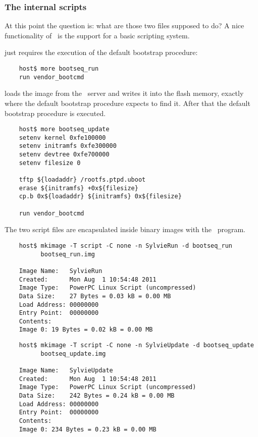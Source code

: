     \subsubsection{The internal scripts}

        At this point the question is: what are those two files supposed to
        do? A nice functionality of \uBoot\ is the support for a basic
        scripting system.

         just requires the execution of the default
        bootstrap procedure:
\begin{lstlisting}
    host$ more bootseq_run
    run vendor_bootcmd
\end{lstlisting}

         loads the 
        image from the \TFTP\ server and writes it into the flash memory,
        exactly where the default bootstrap procedure expects to find it.
        After that the default bootstrap procedure is executed.
\begin{lstlisting}
    host$ more bootseq_update
    setenv kernel 0xfe100000
    setenv initramfs 0xfe300000
    setenv devtree 0xfe700000
    setenv filesize 0

    tftp ${loadaddr} /rootfs.ptpd.uboot
    erase ${initramfs} +0x${filesize}
    cp.b 0x${loadaddr} ${initramfs} 0x${filesize}

    run vendor_bootcmd
\end{lstlisting}

        The two script files are encapsulated inside binary images with
        the \mkimage\ program.
\begin{lstlisting}
    host$ mkimage -T script -C none -n SylvieRun -d bootseq_run
          bootseq_run.img

    Image Name:   SylvieRun
    Created:      Mon Aug  1 10:54:48 2011
    Image Type:   PowerPC Linux Script (uncompressed)
    Data Size:    27 Bytes = 0.03 kB = 0.00 MB
    Load Address: 00000000
    Entry Point:  00000000
    Contents:
    Image 0: 19 Bytes = 0.02 kB = 0.00 MB
\end{lstlisting}

\begin{lstlisting}
    host$ mkimage -T script -C none -n SylvieUpdate -d bootseq_update
          bootseq_update.img

    Image Name:   SylvieUpdate
    Created:      Mon Aug  1 10:54:48 2011
    Image Type:   PowerPC Linux Script (uncompressed)
    Data Size:    242 Bytes = 0.24 kB = 0.00 MB
    Load Address: 00000000
    Entry Point:  00000000
    Contents:
    Image 0: 234 Bytes = 0.23 kB = 0.00 MB
\end{lstlisting}

